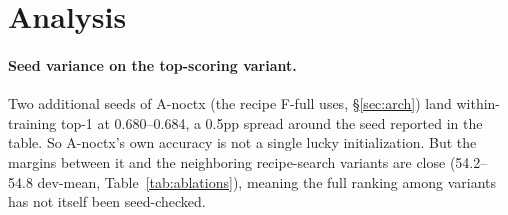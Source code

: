 \section{Analysis}
\label{sec:analysis}
\FloatBarrier

\begin{table}[t]
  \centering
  \caption{The variant grid: zero-shot top-1 (\%) with high-win-rate
  players, point estimates (per-cell 95\% CI half-widths are
  ${\sim}\pm0.1$--$0.2$pp on the dev sets, Table~\ref{tab:main};
  paired-difference CIs accompany the deltas in the text). A-noctx,
  A-proportional, and A-topfilter are architecture variants tested
  against the Full baseline before the deployed architecture was fixed.
  A-notext and A-noUB are the two pre-registered comparisons
  (\S\ref{sec:protocol}) analysed below: A-notext drops the 384-d text
  embedding from the Full recipe, and A-noUB removes the three
  licensed-IP training sets from A-noctx (the winning architecture,
  \S\ref{sec:arch}), so its clean comparator is the A-noctx row, not
  Full. The (variant $\times$ set) grid supplies the dev-side measurement
  of what the text embedding contributes on licensed-universe sets
  (per-set deltas below), computed before MSH is seen.}
  \label{tab:ablations}
  \small
  
\end{table}

\paragraph{Seed variance on the top-scoring variant.}
Two additional seeds of A-noctx (the recipe F-full uses, \S\ref{sec:arch})
land within-training top-1 at 0.680--0.684, a 0.5pp spread around the seed
reported in the table. So A-noctx's own accuracy is not a single lucky
initialization. But the margins between it and the neighboring
recipe-search variants are close (54.2--54.8 dev-mean,
Table~\ref{tab:ablations}), meaning the full ranking among variants has
not itself been seed-checked.

